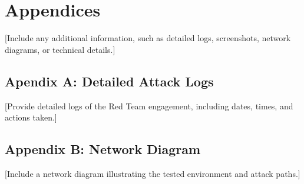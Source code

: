 \section{Appendices}
[Include any additional information, such as detailed logs, screenshots, network diagrams, or technical details.]
\subsection{Apendix A: Detailed Attack Logs}
[Provide detailed logs of the Red Team engagement, including dates, times, and actions taken.]
% 
% 
\subsection{Appendix B: Network Diagram}
[Include a network diagram illustrating the tested environment and attack paths.]\\
